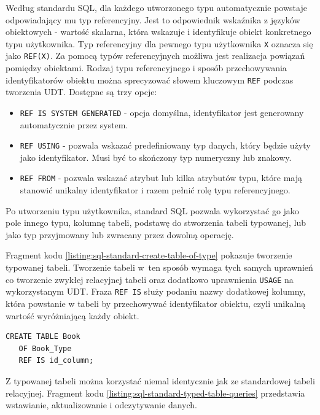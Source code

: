 \documentclass[a4paper,twoside,12pt]{book}
\begin{document}
Według standardu SQL, dla każdego utworzonego typu automatycznie powstaje odpowiadający mu typ referencyjny. Jest to odpowiednik wskaźnika z języków obiektowych - wartość skalarna, która wskazuje i identyfikuje obiekt konkretnego typu użytkownika. Typ referencyjny dla pewnego typu użytkownika \lstinline{X} oznacza się jako \lstinline{REF(X)}. Za pomocą typów referencyjnych możliwa jest realizacja powiązań pomiędzy obiektami. Rodzaj typu referencyjnego i sposób przechowywania identyfikatorów obiektu można sprecyzować słowem kluczowym \lstinline{REF} podczas tworzenia UDT. Dostępne są trzy opcje:
\begin{itemize}
\item \lstinline{REF IS SYSTEM GENERATED} - opcja domyślna, identyfikator jest generowany automatycznie przez system.
\item \lstinline{REF USING} - pozwala wskazać predefiniowany typ danych, który będzie użyty jako identyfikator. Musi być to skończony typ numeryczny lub znakowy. 
\item \lstinline{REF FROM} - pozwala wskazać atrybut lub kilka atrybutów typu, które mają stanowić unikalny identyfikator i razem pełnić rolę typu referencyjnego.
\end{itemize}

Po utworzeniu typu użytkownika, standard SQL pozwala wykorzystać go jako pole innego typu, kolumnę tabeli, podstawę do stworzenia tabeli typowanej, lub jako typ przyjmowany lub zwracany przez dowolną operację.

Fragment kodu \ref{listing:sql-standard-create-table-of-type} pokazuje tworzenie typowanej tabeli. Tworzenie tabeli w~ten sposób wymaga tych samych uprawnień co tworzenie zwykłej relacyjnej tabeli oraz dodatkowo uprawnienia \lstinline{USAGE} na wykorzystanym UDT. Fraza \lstinline{REF IS} służy podaniu nazwy dodatkowej kolumny, która powstanie w tabeli by przechowywać identyfikator obiektu, czyli unikalną wartość wyróżniającą każdy obiekt.

\begin{lstlisting}[style=SQL, caption={Tworzenie typowanej tabeli według standardu SQL.}, label={listing:sql-standard-create-table-of-type}, captionpos=b]
CREATE TABLE Book
   OF Book_Type 
   REF IS id_column;
\end{lstlisting}

Z typowanej tabeli można korzystać niemal identycznie jak ze standardowej tabeli relacyjnej. Fragment kodu \ref{listing:sql-standard-typed-table-queries} przedstawia wstawianie, aktualizowanie i odczytywanie danych.
\end{document}
